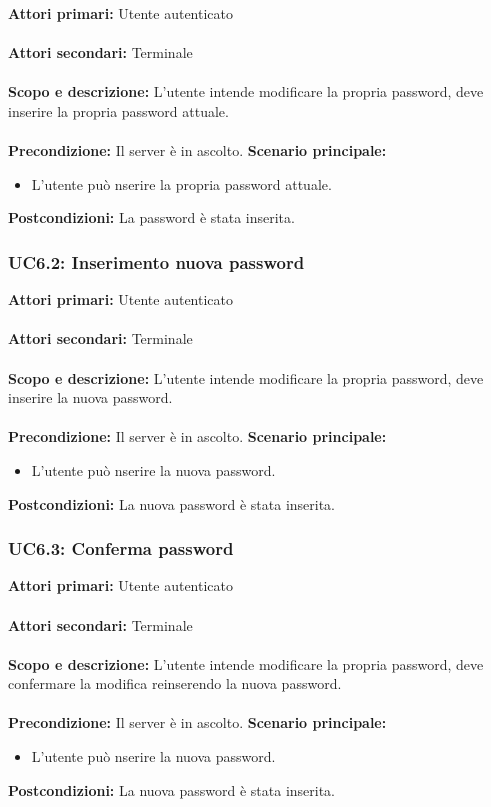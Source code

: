 \documentclass{scalatekids-article}
\begin{document}
\textbf{Attori primari:} Utente autenticato\\ \\
\textbf{Attori secondari:} Terminale\\ \\
\textbf{Scopo e descrizione:} L'utente intende modificare la propria password, deve inserire la propria password attuale.\\ \\
\textbf{Precondizione:} Il server è in ascolto.
\textbf{Scenario principale:}
\begin{itemize}
\item L'utente può nserire la propria password attuale.
\end{itemize}
\textbf{Postcondizioni:} La password è stata inserita.

\subsubsection{UC6.2: Inserimento nuova password}

\textbf{Attori primari:} Utente autenticato\\ \\
\textbf{Attori secondari:} Terminale\\ \\
\textbf{Scopo e descrizione:} L'utente intende modificare la propria password, deve inserire la nuova password.\\ \\
\textbf{Precondizione:} Il server è in ascolto.
\textbf{Scenario principale:}
\begin{itemize}
\item L'utente può nserire la nuova password.
\end{itemize}
\textbf{Postcondizioni:} La nuova password è stata inserita.

\subsubsection{UC6.3: Conferma password}

\textbf{Attori primari:} Utente autenticato\\ \\
\textbf{Attori secondari:} Terminale\\ \\
\textbf{Scopo e descrizione:} L'utente intende modificare la propria password, deve confermare la modifica reinserendo la nuova password.\\ \\
\textbf{Precondizione:} Il server è in ascolto.
\textbf{Scenario principale:}
\begin{itemize}
\item L'utente può nserire la nuova password.
\end{itemize}
\textbf{Postcondizioni:} La nuova password è stata inserita.
\end{document}
